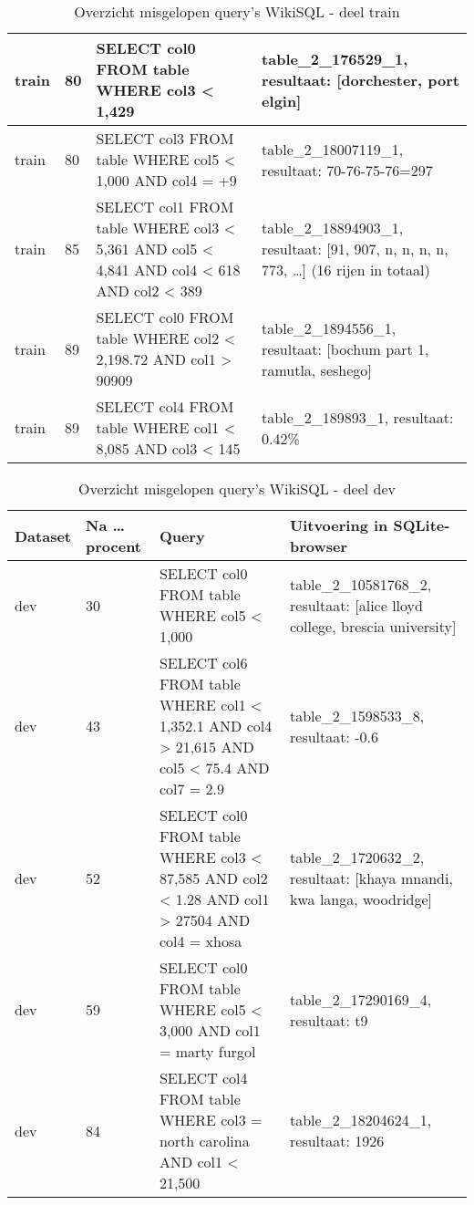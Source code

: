 \begin{table}[]
\begin{tabular}{ | l | l | p{5cm} | p{5cm} |}
		train 	& 80 			   & SELECT col0 FROM table WHERE col3 < 1,429 & table\_2\_176529\_1, resultaat: [dorchester, port elgin]  \\ \hline
		train 	& 80 			   & SELECT col3 FROM table WHERE col5 < 1,000 AND col4 = +9 & table\_2\_18007119\_1, resultaat: 70-76-75-76=297  \\ \hline
		train 	& 85 			   & SELECT col1 FROM table WHERE col3 < 5,361 AND col5 < 4,841 AND col4 < 618 AND col2 < 389 & table\_2\_18894903\_1, resultaat: [91, 907, n, n, n, n, 773, \dots] (16 rijen in totaal)  \\ \hline
		train	& 89 			   & SELECT col0 FROM table WHERE col2 < 2,198.72 AND col1 > 90909 & table\_2\_1894556\_1, resultaat: [bochum part 1, ramutla, seshego]  \\ \hline
		train	& 89 			   & SELECT col4 FROM table WHERE col1 < 8,085 AND col3 < 145 & table\_2\_189893\_1, resultaat: 0.42\%  \\ \hline
	\end{tabular}
	\caption{Overzicht misgelopen query's WikiSQL - deel train}
	\label{table:wikisqlerrorstrain}
\end{table}

\begin{table}[]
	\centering
	\begin{tabular}{ | l | l | p{5cm} | p{5cm} |}
		\hline
		Dataset & Na \dots procent & Query & Uitvoering in SQLite-browser \\ \hline
		dev 	& 30 			   & SELECT col0 FROM table WHERE col5 < 1,000 & table\_2\_10581768\_2, resultaat: [alice lloyd college, brescia university]  \\ \hline
		dev 	& 43 			   & SELECT col6 FROM table WHERE col1 < 1,352.1 AND col4 > 21,615 AND col5 < 75.4 AND col7 = 2.9  & table\_2\_1598533\_8, resultaat: -0.6  \\ \hline
		dev 	& 52 			   & SELECT col0 FROM table WHERE col3 < 87,585 AND col2 < 1.28 AND col1 > 27504 AND col4 = xhosa & table\_2\_1720632\_2, resultaat: [khaya mnandi, kwa langa, woodridge]  \\ \hline
		dev 	& 59 			   & SELECT col0 FROM table WHERE col5 < 3,000 AND col1 = marty furgol & table\_2\_17290169\_4, resultaat: t9  \\ \hline
		dev 	& 84 			   & SELECT col4 FROM table WHERE col3 = north carolina AND col1 < 21,500 & table\_2\_18204624\_1, resultaat: 1926  \\ \hline
	\end{tabular}
	\caption{Overzicht misgelopen query's WikiSQL - deel dev}
	\label{table:wikisqlerrorsdev}
\end{table}

